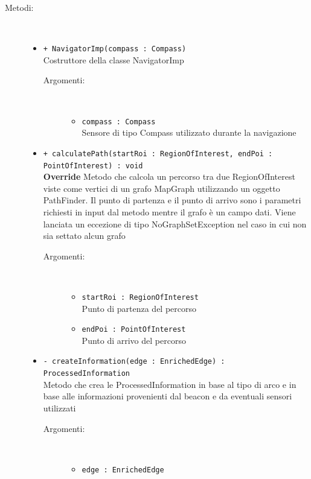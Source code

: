 \documentclass[../DefinizioneDiProdotto.tex]{subfiles}
\begin{document}
\begin{description}
\begin{itemize}
	\end{itemize}
	\item[Metodi:] \
	\begin{itemize}
		\item \texttt{+ NavigatorImp(compass : Compass)}\\
		Costruttore della classe NavigatorImp
		\begin{description}
			\item[Argomenti:] \
			\begin{itemize}
				\item \texttt{compass : Compass}\\
				Sensore di tipo Compass utilizzato durante la navigazione\end{itemize}
		\end{description}
		\item \texttt{+ calculatePath(startRoi : RegionOfInterest, endPoi :\\ PointOfInterest) : void}\\
		\textbf{Override} Metodo che calcola un percorso tra due RegionOfInterest viste come vertici di un grafo MapGraph utilizzando un oggetto PathFinder. Il punto di partenza e il punto di arrivo sono i parametri richiesti in input dal metodo mentre il grafo è un campo dati. Viene lanciata un eccezione di tipo NoGraphSetException nel caso in cui non sia settato alcun grafo
		\begin{description}
			\item[Argomenti:] \
			\begin{itemize}
				\item \texttt{startRoi : RegionOfInterest}\\
				Punto di partenza del percorso\item \texttt{endPoi : PointOfInterest}\\
				Punto di arrivo del percorso\end{itemize}
		\end{description}
		\item \texttt{- createInformation(edge : EnrichedEdge) : ProcessedInformation}\\
		Metodo che crea le ProcessedInformation in base al tipo di arco e in base alle informazioni provenienti dal beacon e da eventuali sensori utilizzati
		\begin{description}
			\item[Argomenti:] \
			\begin{itemize}
				\item \texttt{edge : EnrichedEdge}\\

\end{itemize}
\end{description}
\end{itemize}
\end{description}
\end{document}
